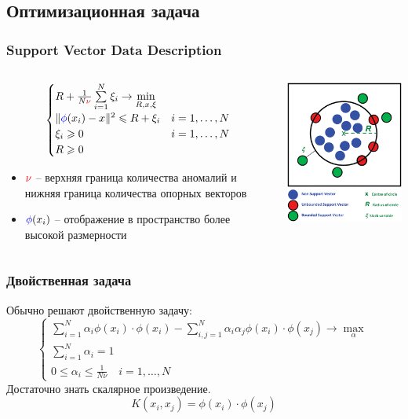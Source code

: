 \documentclass[10pt,pdf]{beamer}
\newcommand*{\mathcolor}{}
\def\mathcolor#1#{\mathcoloraux{#1}}
\newcommand*{\mathcoloraux}[3]{%
  \protect\leavevmode
  \begingroup
    \color#1{#2}#3%
  \endgroup
}
\begin{document}
\subsection{Оптимизационная задача}
\begin{frame}\frametitle{Support Vector Data Description}
\begin{columns}[T]
\begin{column}{6cm}
\[
\begin{cases}
  R + \frac{1}{N\mathcolor{red}{\nu}}\sum\limits_{i=1}^N\xi_i \to \min\limits_{R, x, \xi}\\
  \| \mathcolor{blue}{\phi}(x_i) - x\|^2 \leqslant R + \xi_i & i = 1,\ldots,N\\
  \xi_i \geqslant 0 & i = 1, \ldots, N\\
  R \geqslant 0
  \end{cases}
 \]
 \begin{itemize}
 \item $\mathcolor{red}{\nu}$ -- верхняя граница количества аномалий и нижняя граница количества опорных векторов
 \item $\mathcolor{blue}{\phi}(x_i)$ -- отображение в пространство более высокой размерности
 \end{itemize}
 \end{column}
\begin{column}{6cm}
\includegraphics[scale=0.5]{SVDD_explanation.png}
\end{column}
\end{columns}
\end{frame}


\begin{frame}\frametitle{Двойственная задача}
Обычно решают двойственную задачу:
\[
\begin{cases}
\sum\limits_{i=1}^N \alpha_i \phi(x_i)\cdot \phi(x_i) - \sum\limits_{i,j=1}^N\alpha_i \alpha_j \phi(x_i)\cdot \phi(x_j) \to \max\limits_{\alpha} \\
\sum\limits_{i=1}^N \alpha_i = 1\\
0 \leqslant \alpha_i \leqslant \frac{1}{N\nu} \quad i=1,\ldots,N
\end{cases}
\]
Достаточно знать скалярное произведение.
\[
K(x_i, x_j) = \phi(x_i) \cdot \phi(x_j)
\]
\end{frame}
\end{document}
